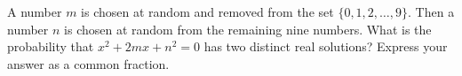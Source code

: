 A number $m$ is chosen at random and removed from the set $\{0,1,2,\dots,9\}$. Then a number $n$ is chosen at random from the remaining nine numbers. What is the probability that $x^2+2mx+n^2=0$ has two distinct real solutions? Express your answer as a common fraction.
